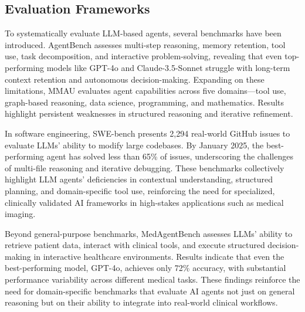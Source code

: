 \subsection{Evaluation Frameworks}
To systematically evaluate LLM-based agents, several benchmarks have been introduced. AgentBench \cite{liu2023agentbench} assesses multi-step reasoning, memory retention, tool use, task decomposition, and interactive problem-solving, revealing that even top-performing models like GPT-4o and Claude-3.5-Sonnet struggle with long-term context retention and autonomous decision-making. Expanding on these limitations, MMAU \cite{yin2024mmau} evaluates agent capabilities across five domains—tool use, graph-based reasoning, data science, programming, and mathematics. Results highlight persistent weaknesses in structured reasoning and iterative refinement.

In software engineering, SWE-bench \cite{jimenez2023swe} presents 2,294 real-world GitHub issues to evaluate LLMs' ability to modify large codebases. By January 2025, the best-performing agent has solved less than 65\% of issues, underscoring the challenges of multi-file reasoning and iterative debugging. These benchmarks collectively highlight LLM agents' deficiencies in contextual understanding, structured planning, and domain-specific tool use, reinforcing the need for specialized, clinically validated AI frameworks in high-stakes applications such as medical imaging.

Beyond general-purpose benchmarks, MedAgentBench \cite{2501.14654} assesses LLMs' ability to retrieve patient data, interact with clinical tools, and execute structured decision-making in interactive healthcare environments. Results indicate that even the best-performing model, GPT-4o, achieves only 72\% accuracy, with substantial performance variability across different medical tasks. These findings reinforce the need for domain-specific benchmarks that evaluate AI agents not just on general reasoning but on their ability to integrate into real-world clinical workflows.